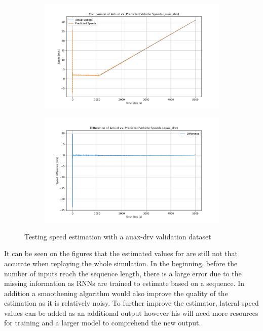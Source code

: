 \begin{figure}[htbp]
    \centering

    \begin{subfigure}{1\textwidth}
        \centering
        \includegraphics[width=\linewidth]{images/RNN_results/model_0_auax_drv_act_vs_predicted_speed.png}
    \end{subfigure}
    \hfill
    \begin{subfigure}{1\textwidth}
        \centering
        \includegraphics[width=\linewidth]{images/RNN_results/model_0_auax_drv_act_vs_predicted_speed_diff.png}
    \end{subfigure}
    \caption{Testing speed estimation with a auax-drv validation dataset}
    \label{fig:rnn_results_auax_drv}
\end{figure}
\FloatBarrier

It can be seen on the figures that the estimated values for are still not that accurate when replaying the whole simulation. In the beginning, before the number of inputs reach the sequence length, there is a large error due to the missing information as RNNs are trained to estimate based on a sequence. In addition a smoothening algorithm would also improve the quality of the estimation as it is relatively noisy. To further improve the estimator, lateral speed values can be added as an additional output however his will need more resources for training and a larger model to comprehend the new output.  

